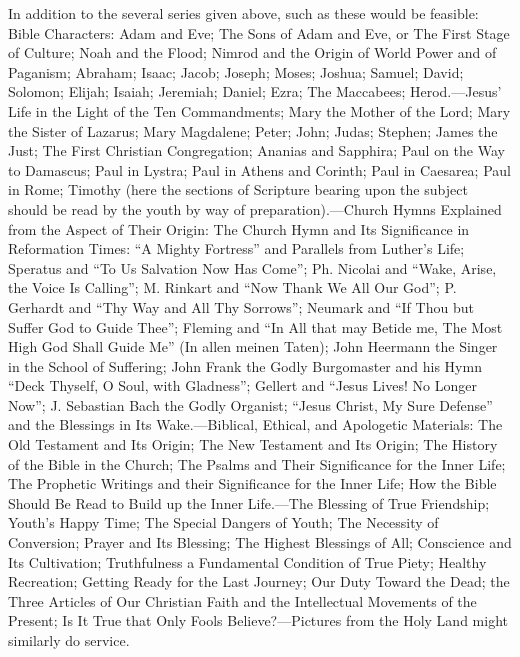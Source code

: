 In addition to the several series given above, such as these would be feasible: Bible Characters: Adam and Eve; The Sons of Adam
and Eve, or The First Stage of Culture; Noah and the Flood; Nimrod and the Origin of World Power and of Paganism; Abraham; Isaac; Jacob; Joseph; Moses; Joshua; Samuel; David; Solomon; Elijah; Isaiah; Jeremiah; Daniel; Ezra; The Maccabees; Herod.—Jesus’ Life in the Light of the Ten Commandments; Mary the Mother of the Lord; Mary the Sister of Lazarus; Mary Magdalene; Peter; John; Judas; Stephen; James the Just; The First Christian Congregation; Ananias and Sapphira; Paul on the Way to Damascus; Paul in Lystra; Paul in Athens and Corinth; Paul in Caesarea; Paul in Rome; Timothy (here the sections of Scripture bearing upon the subject should be read by the youth by way of preparation).—Church Hymns Explained from the Aspect of Their Origin: The Church Hymn and Its Significance in Reformation Times: “A Mighty Fortress” and Parallels from Luther’s Life; Speratus and “To Us Salvation Now Has Come”; Ph. Nicolai and “Wake, Arise, the Voice Is Calling”; M. Rinkart and “Now Thank We All Our God”; P. Gerhardt and “Thy Way and All Thy Sorrows”; Neumark and “If Thou but Suffer God to Guide Thee”; Fleming and “In All that may Betide me, The Most High God Shall Guide Me” (In allen meinen Taten); John Heermann the Singer in the School of Suffering; John Frank the Godly Burgomaster and his Hymn “Deck Thyself, O Soul, with Gladness”; Gellert and “Jesus Lives! No Longer Now”; J. Sebastian Bach the Godly Organist; “Jesus Christ, My Sure Defense” and the Blessings in Its Wake.—Biblical, Ethical, and Apologetic Materials: The Old Testament and Its Origin; The New Testament and Its Origin; The History of the Bible in the Church; The Psalms and Their Significance for the Inner Life; The Prophetic Writings and their Significance for the Inner Life; How the Bible Should Be Read to Build up the Inner Life.—The Blessing of True Friendship; Youth’s Happy Time; The Special Dangers of Youth; The Necessity of Conversion; Prayer and Its Blessing; The Highest Blessings of All; Conscience and Its Cultivation; Truthfulness a Fundamental Condition of True Piety; Healthy Recreation; Getting Ready for the Last Journey; Our Duty Toward the Dead; the Three Articles of Our Christian Faith and the Intellectual Movements of the Present; Is It True that Only Fools Believe?—Pictures from the Holy Land might similarly do service.
